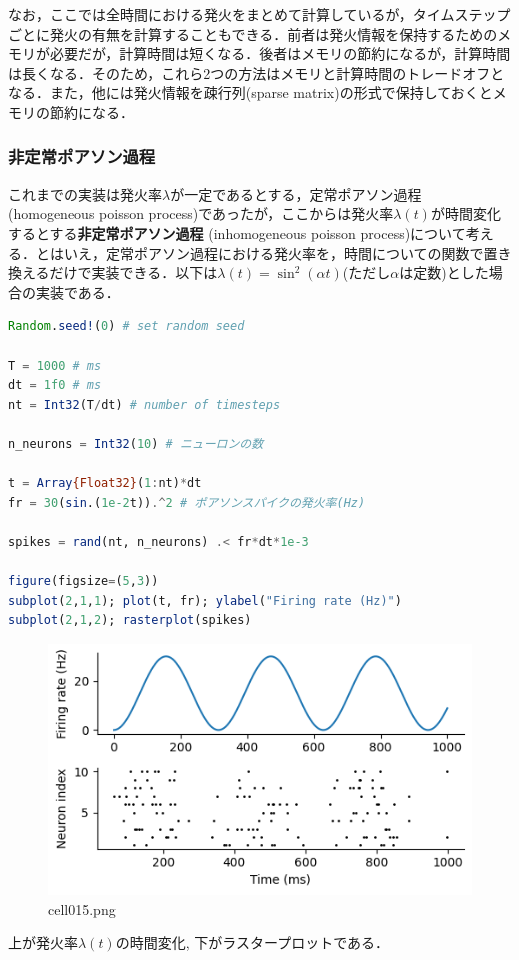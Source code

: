 なお，ここでは全時間における発火をまとめて計算しているが，タイムステップごとに発火の有無を計算することもできる．前者は発火情報を保持するためのメモリが必要だが，計算時間は短くなる．後者はメモリの節約になるが，計算時間は長くなる．そのため，これら2つの方法はメモリと計算時間のトレードオフとなる．また，他には発火情報を疎行列(sparse matrix)の形式で保持しておくとメモリの節約になる．
\subsubsection{非定常ポアソン過程}
これまでの実装は発火率$\lambda$が一定であるとする，定常ポアソン過程 (homogeneous poisson process)であったが，ここからは発火率$\lambda(t)$が時間変化するとする\textbf{非定常ポアソン過程} (inhomogeneous poisson process)について考える．とはいえ，定常ポアソン過程における発火率を，時間についての関数で置き換えるだけで実装できる．以下は$\lambda(t)=\sin^2(\alpha t)$(ただし$\alpha$は定数)とした場合の実装である．
\begin{lstlisting}[language=julia]
Random.seed!(0) # set random seed

T = 1000 # ms
dt = 1f0 # ms
nt = Int32(T/dt) # number of timesteps

n_neurons = Int32(10) # ニューロンの数

t = Array{Float32}(1:nt)*dt
fr = 30(sin.(1e-2t)).^2 # ポアソンスパイクの発火率(Hz)

spikes = rand(nt, n_neurons) .< fr*dt*1e-3

figure(figsize=(5,3))
subplot(2,1,1); plot(t, fr); ylabel("Firing rate (Hz)")
subplot(2,1,2); rasterplot(spikes)
\end{lstlisting}
\begin{figure}[ht]
	\centering
	\includegraphics[scale=0.8, max width=\linewidth]{./fig/neuron-model/isi/cell015.png}
	\caption{cell015.png}
	\label{cell015.png}
\end{figure}
上が発火率$\lambda(t)$の時間変化, 下がラスタープロットである．
